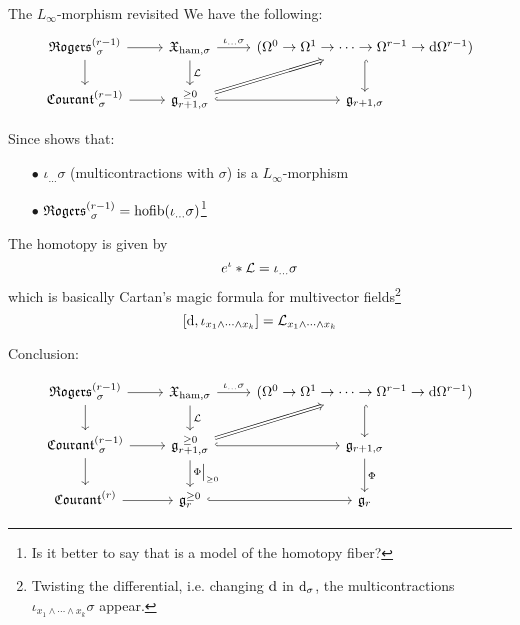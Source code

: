 \documentclass[beamer,10pt]{standalone}
\begin{document}
\begin{frame}{The \cite{Miti2021} $L_\infty$-morphism revisited}
	We have the following:
	\begin{displaymath}
		\begin{tikzcd}[ampersand replacement=\&]
			\Rogers[\sigma]{r-1} \ar[d] \ar[r] \&
			\X_{\ham,\sigma} \ar[r,"\iota_{\dots}\sigma"] \ar[d,"\Lie"]\&
			(\Omega^0\to\Omega^1\to\cdots\to\Omega^{r-1}\to \d \Omega^{r-1}) \ar[d,hook] 
			\\
			\Courant[\sigma]{r-1} \ar[r] \&
			\g_{r+1,\sigma}^{~\geq 0} \ar[r,hook] \ar[ur,Rightarrow]\& 
			\g_{r+1,\sigma}
		\end{tikzcd}
	\end{displaymath}
	\vfill

	Since \cite{Fiorenza2014a} shows that:
	\begin{itemize}
		\item[$\bullet$] $\iota_{\ldots}\sigma$ (multicontractions with $\sigma$) is a $L_\infty$-morphism
		\item[$\bullet$] $\Rogers[\sigma]{r-1} =\hofib(\iota_{\ldots}\sigma)$\footnote{Is it better to say that is a model of the homotopy fiber?}
	\end{itemize}
	\vfill

	The homotopy is given by $$ e^{\iota} * \Lie = \iota_{\ldots}\sigma$$
	which is basically Cartan's magic formula for multivector fields\footnote{Twisting the differential, i.e. changing $\d$ in $\d_\sigma$, the multicontractions $\iota_{x_1\wedge\cdots\wedge x_k}\sigma$ appear.}
	$$[\d, \iota_{x_1\wedge\cdots\wedge x_k}] = \Lie_{x_1\wedge\cdots\wedge x_k}$$

\end{frame}



\begin{frame}{Conclusion:}

	\vfill

	\begin{displaymath}
		\begin{tikzcd}[ampersand replacement=\&]
			\Rogers[\sigma]{r-1} \ar[d] \ar[r] \&
			\X_{\ham,\sigma} \ar[r,"\iota_{\dots}\sigma"] \ar[d,"\Lie"]\&
			(\Omega^0\to\Omega^1\to\cdots\to\Omega^{r-1}\to \d \Omega^{r-1}) \ar[d,hook] 
			\\
			\Courant[\sigma]{r-1} \ar[r] \ar[d]\&
			\g_{r+1,\sigma}^{~\geq 0} \ar[r,hook] \ar[ur,Rightarrow] \ar[d,"\Phi\big\vert_{\geq 0}"]\& 
			\g_{r+1,\sigma} \ar[d,"\Phi"]
			\\
			\Courant{r} \ar[r] \&
			\g_{r}^{\geq 0} \ar[r,hook]\&
			\g_{r}
		\end{tikzcd}
	\end{displaymath}
\end{frame}
\end{document}
